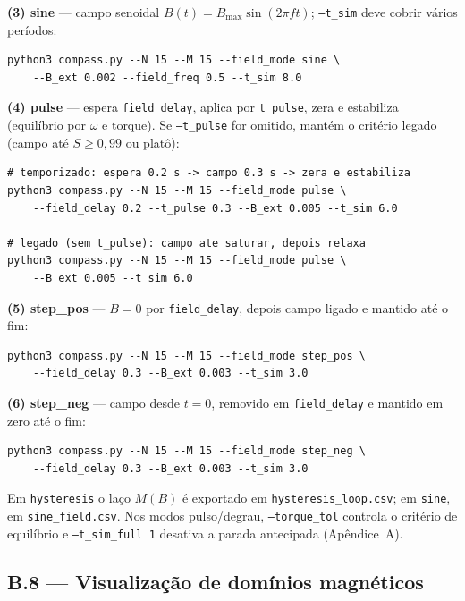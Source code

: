 \documentclass[11pt,a4paper]{article}
\newcommand{\code}[1]{\texttt{#1}}
\begin{document}
\noindent\textbf{(3) sine} --- campo senoidal
$B(t) = B_{\max}\sin(2\pi f t)$; \code{--t\_sim} deve cobrir vários
períodos:
\begin{verbatim}
python3 compass.py --N 15 --M 15 --field_mode sine \
    --B_ext 0.002 --field_freq 0.5 --t_sim 8.0
\end{verbatim}

\noindent\textbf{(4) pulse} --- espera \code{field\_delay}, aplica por
\code{t\_pulse}, zera e estabiliza (equilíbrio por $\omega$ e torque). Se
\code{--t\_pulse} for omitido, mantém o critério legado (campo até
$S \geq 0{,}99$ ou platô):
\begin{verbatim}
# temporizado: espera 0.2 s -> campo 0.3 s -> zera e estabiliza
python3 compass.py --N 15 --M 15 --field_mode pulse \
    --field_delay 0.2 --t_pulse 0.3 --B_ext 0.005 --t_sim 6.0

# legado (sem t_pulse): campo ate saturar, depois relaxa
python3 compass.py --N 15 --M 15 --field_mode pulse \
    --B_ext 0.005 --t_sim 6.0
\end{verbatim}

\noindent\textbf{(5) step\_pos} --- $B{=}0$ por \code{field\_delay},
depois campo ligado e mantido até o fim:
\begin{verbatim}
python3 compass.py --N 15 --M 15 --field_mode step_pos \
    --field_delay 0.3 --B_ext 0.003 --t_sim 3.0
\end{verbatim}

\noindent\textbf{(6) step\_neg} --- campo desde $t{=}0$, removido em
\code{field\_delay} e mantido em zero até o fim:
\begin{verbatim}
python3 compass.py --N 15 --M 15 --field_mode step_neg \
    --field_delay 0.3 --B_ext 0.003 --t_sim 3.0
\end{verbatim}

\noindent Em \code{hysteresis} o laço $M(B)$ é exportado em
\code{hysteresis\_loop.csv}; em \code{sine}, em \code{sine\_field.csv}.
Nos modos pulso/degrau, \code{--torque\_tol} controla o critério de
equilíbrio e \code{--t\_sim\_full 1} desativa a parada antecipada
(Apêndice~A).

\subsection*{B.8 --- Visualização de domínios magnéticos}
\end{document}
